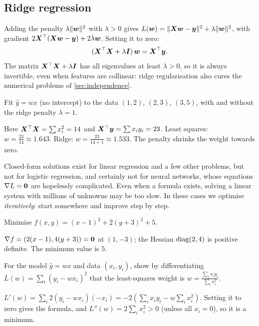 \subsection{Ridge regression}

Adding the penalty $\lambda\lVert\bm{w}\rVert^2$ with $\lambda > 0$ gives
$L(\bm{w}) = \lVert\bm{X}\bm{w} - \bm{y}\rVert^2 + \lambda\lVert\bm{w}\rVert^2$, with gradient
$2\bm{X}^\top(\bm{X}\bm{w} - \bm{y}) + 2\lambda\bm{w}$. Setting it to zero:
\[
  (\bm{X}^\top\bm{X} + \lambda\bm{I})\,\bm{w} = \bm{X}^\top\bm{y} .
\]
The matrix $\bm{X}^\top\bm{X} + \lambda\bm{I}$ has all eigenvalues at least $\lambda > 0$,
so it is always invertible, even when features are collinear: ridge
regularisation also cures the numerical problems of \cref{sec:independence}.

\begin{example}\label{ex:ridge-1d}
Fit $\hat y = wx$ (no intercept) to the data $(1, 2)$, $(2, 3)$, $(3, 5)$, with
and without the ridge penalty $\lambda = 1$.

\sol Here $\bm{X}^\top\bm{X} = \sum x_i^2 = 14$ and $\bm{X}^\top\bm{y} = \sum x_iy_i = 23$. Least
squares: $w = \frac{23}{14} \approx 1.643$. Ridge: $w = \frac{23}{14 + 1}
\approx 1.533$. The penalty shrinks the weight towards zero.
\end{example}

\begin{remark}
Closed-form solutions exist for linear regression and a few other problems,
but not for logistic regression, and certainly not for neural networks, whose
equations $\nabla L = \bm{0}$ are hopelessly complicated. Even when a formula
exists, solving a linear system with millions of unknowns may be too slow. In
these cases we optimise \emph{iteratively}: start somewhere and improve step by
step.
\end{remark}

\sectionexercises

\begin{exercise}
Minimise $f(x, y) = (x - 1)^2 + 2(y + 3)^2 + 5$.
\end{exercise}
\begin{solution}
$\nabla f = (2(x - 1), 4(y + 3)) = \bm{0}$ at $(1, -3)$; the Hessian
$\operatorname{diag}(2, 4)$ is positive definite. The minimum value is $5$.
\end{solution}

\begin{exercise}
For the model $\hat y = wx$ and data $(x_i, y_i)$, show by differentiating
$L(w) = \sum_i(y_i - wx_i)^2$ that the least-squares weight is
$w = \frac{\sum_ix_iy_i}{\sum_ix_i^2}$.
\end{exercise}
\begin{solution}
$L'(w) = \sum_i 2(y_i - wx_i)(-x_i) = -2\left(\sum_ix_iy_i - w\sum_ix_i^2\right)$.
Setting it to zero gives the formula, and $L''(w) = 2\sum_ix_i^2 > 0$ (unless
all $x_i = 0$), so it is a minimum.
\end{solution}

